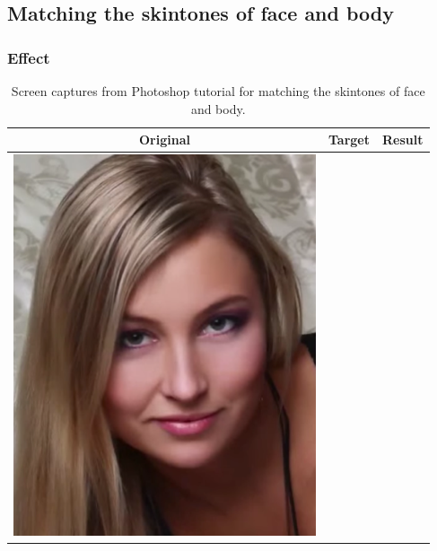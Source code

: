 \subsection{Matching the skintones of face and body \cite{photoshop:match_body}}\label{app:photoshop_match_body}

\subsubsection*{Effect}
\begin{longtable}{|c|c|c|}
    \caption{Screen captures from Photoshop tutorial for matching the skintones of face and body.}\\
    \hline
    Original & Target & Result \\
    \hline
  \begin{minipage}{.29\textwidth}
    \includegraphics[width=\textwidth,height=\textheight,keepaspectratio]{images/match_body_orig}
  \end{minipage} & 
  \begin{minipage}{.29\textwidth}

\end{minipage}
\end{longtable}
